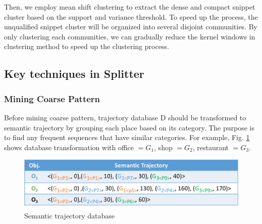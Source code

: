 \documentclass[conference]{IEEEtran}
\begin{document}
\par
Then, we employ mean shift clustering to extract the dense and compact snippet cluster based on the support and variance threshold. To speed up the process, the unqualified snippet cluster will be organized into several disjoint communities. By only clustering each communities, we can gradually reduce the kernel windows in clustering method to speed up the clustering process.

\subsection{Key techniques in Splitter}
\subsubsection{Mining Coarse Pattern}
Before mining coarse pattern, trajectory database D should be transformed to semantic trajectory by grouping each place based on its category. The purpose is to find any frequent sequences that have similar categories. For example, Fig. \ref{fig:transformed-database} shows database transformation with office $=G_{1}$, shop $=G_{2}$, restaurant $=G_{3}$. 

\begin{figure}[!ht]
	\centering
	\includegraphics[width=1\linewidth]{transformed_database}
	\caption{Semantic trajectory database}
	\label{fig:transformed-database}
\end{figure}
\end{document}
